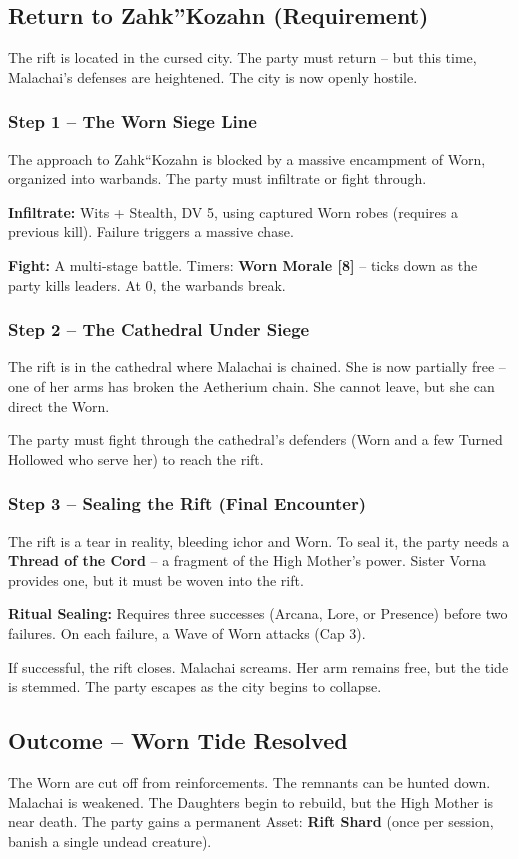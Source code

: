 \documentclass[10pt,twoside]{book}
\begin{document}
\subsection{Return to Zahk''Kozahn (Requirement)}
The rift is located in the cursed city. The party must return -- but this time, Malachai's defenses are heightened. The city is now openly hostile.

\subsubsection{Step 1 -- The Worn Siege Line}
The approach to Zahk``Kozahn is blocked by a massive encampment of Worn, organized into warbands. The party must infiltrate or fight through.

\textbf{Infiltrate:} Wits + Stealth, DV 5, using captured Worn robes (requires a previous kill). Failure triggers a massive chase.

\textbf{Fight:} A multi-stage battle. Timers: \textbf{Worn Morale [8]} -- ticks down as the party kills leaders. At 0, the warbands break.

\subsubsection{Step 2 -- The Cathedral Under Siege}
The rift is in the cathedral where Malachai is chained. She is now partially free -- one of her arms has broken the Aetherium chain. She cannot leave, but she can direct the Worn.

The party must fight through the cathedral's defenders (Worn and a few Turned Hollowed who serve her) to reach the rift.

\subsubsection{Step 3 -- Sealing the Rift (Final Encounter)}
The rift is a tear in reality, bleeding ichor and Worn. To seal it, the party needs a \textbf{Thread of the Cord} -- a fragment of the High Mother's power. Sister Vorna provides one, but it must be woven into the rift.

\textbf{Ritual Sealing:} Requires three successes (Arcana, Lore, or Presence) before two failures. On each failure, a Wave of Worn attacks (Cap 3).

If successful, the rift closes. Malachai screams. Her arm remains free, but the tide is stemmed. The party escapes as the city begins to collapse.

\subsection{Outcome -- Worn Tide Resolved}
The Worn are cut off from reinforcements. The remnants can be hunted down. Malachai is weakened. The Daughters begin to rebuild, but the High Mother is near death. The party gains a permanent Asset: \textbf{Rift Shard} (once per session, banish a single undead creature).
\end{document}
